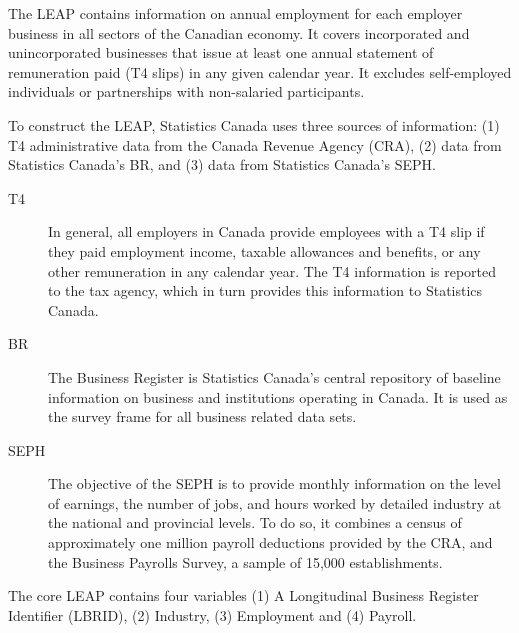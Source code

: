 
The \ac{LEAP} \citep{GovernmentofCanada2019a} contains information on annual employment for each employer business in all sectors of the Canadian economy. It covers incorporated and unincorporated businesses that issue at least one annual statement of remuneration paid (T4 slips) in any given calendar year. It excludes self-employed individuals or partnerships with non-salaried participants.

To construct the \ac{LEAP}, Statistics Canada uses three sources of information: (1) T4 administrative data  from the Canada Revenue Agency (CRA), (2) data from Statistics Canada's \acl{BR}, and (3) data from  Statistics Canada's \acf{SEPH}. 



\begin{description}
\item[T4] In general, all employers in Canada provide employees with a T4 slip if they paid employment income, taxable allowances and benefits, or any other remuneration in any calendar year. The T4 information is reported to the tax agency, which in turn provides this information to Statistics Canada. 

\item[BR] The Business Register is Statistics Canada's central repository of baseline information on business and institutions operating in Canada. It is used as the survey frame for all business related data sets.

\item[SEPH] The objective of the \ac{SEPH} is to provide monthly information on the level of earnings, the number of jobs, and hours worked by detailed industry at the national and provincial levels. To do so, it combines a census of approximately one million payroll deductions provided by the CRA, and the Business Payrolls Survey, a sample of 15,000 establishments.  
\end{description}
The core \ac{LEAP}  contains four variables (1) A Longitudinal Business Register Identifier (LBRID), (2) Industry, (3) Employment and (4) Payroll. 

